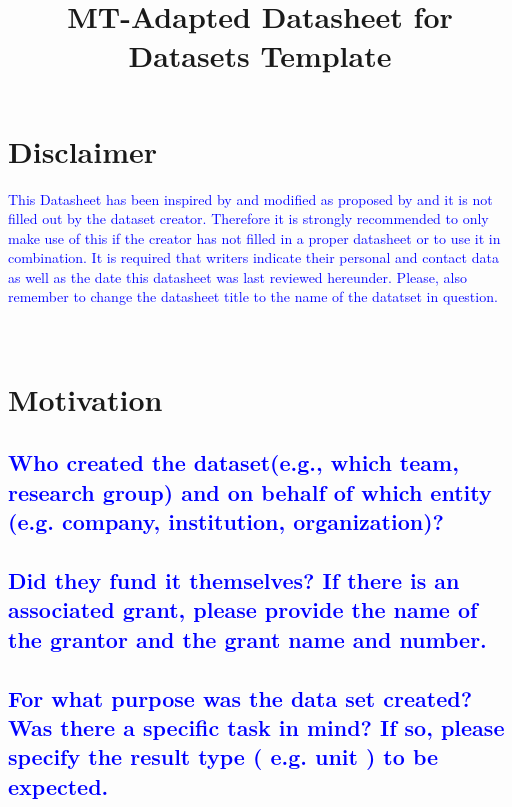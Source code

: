 \documentclass[letterpaper, 10 pt, conference]{ieeeconf}  %
\title{%
  MT-Adapted Datasheet for Datasets Template \\
  }
\begin{document}
\maketitle
\thispagestyle{empty}
\pagestyle{empty}

\section*{Disclaimer}

\textcolor{blue}{{This Datasheet has been inspired by \cite{Datasheets4Datasets} and modified as proposed by \cite{costajussa:2020} and it is not filled out by the dataset creator. Therefore it is strongly recommended to only make use of this if the creator has not filled in a proper datasheet or to use it in combination.
It is required that writers indicate their personal and contact data as well as the date this datasheet was last reviewed hereunder. Please, also remember to change the datasheet title to the name of the datatset in question.}}

\lipsum[1]
\\



\section{Motivation}

\textcolor{blue}{\subsection{Who created the dataset(e.g., which team, research group) and on behalf of which entity (e.g. company, institution, organization)?}}
\lipsum[1]

\textcolor{blue}{\subsection{Did they fund it themselves? If there is an associated grant, please provide the name of the grantor and the grant name and number.}}
\lipsum[1]

\textcolor{blue}{\subsection{For what purpose was the data set created? Was there a specific task in mind? If so, please specify the result type ( e.g. unit ) to be expected.}}
\lipsum[1]
\end{document}
